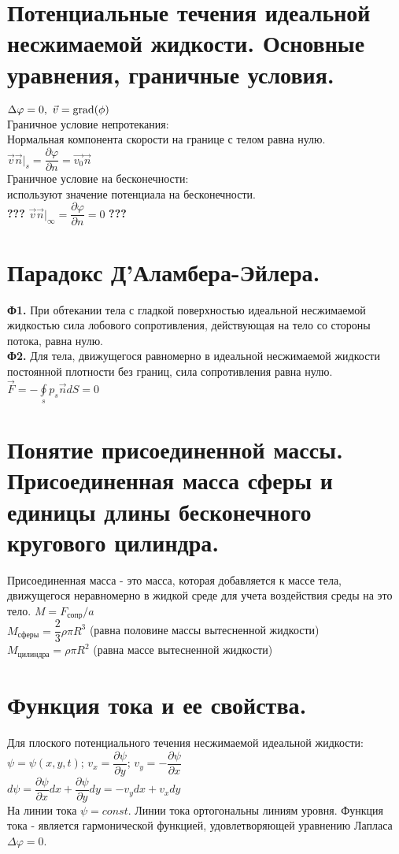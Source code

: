 \begin{multicols*}{2}
		\section{Потенциальные течения идеальной несжимаемой жидкости. Основные уравнения, граничные условия.}
		$\Delta \varphi=0,~\vec{v}=\operatorname{grad}(\phi)$ \\
		Граничное условие непротекания: \\
		Нормальная компонента скорости на границе с телом равна нулю.\\
		$\vec{v}\vec{n}|_s=\dfrac{\partial\varphi}{\partial n}=\vec{v_0}\vec{n}$ \\
		Граничное условие на бесконечности: \\
		используют значение потенциала на бесконечности.\\
		\textbf{???} $\vec{v}\vec{n}|_\infty =\dfrac{\partial\varphi}{\partial n}=0$ \textbf{???}
		
		\section{Парадокс Д’Аламбера-Эйлера.}
		\textbf{Ф1.} При обтекании тела с гладкой поверхностью идеальной
		несжимаемой жидкостью сила лобового сопротивления, действующая на тело
		со стороны потока, равна нулю. \\
		\textbf{Ф2.} Для тела, движущегося равномерно в идеальной несжимаемой жидкости постоянной плотности без границ, сила сопротивления равна
		нулю.\\
		$\vec{F}=-\oint\limits_sp_s\vec{n}dS=0$
		
		\section{Понятие присоединенной массы. Присоединенная масса сферы и единицы длины бесконечного кругового цилиндра.}
		Присоединенная масса - это масса, которая добавляется к массе тела, движущегося неравномерно в жидкой среде для учета воздействия среды на это тело.
		$M=F_\text{сопр}/a$ \\
		$M_\text{сферы}=\dfrac{2}{3}\rho\pi R^3$ (равна половине массы вытесненной жидкости)\\
		$M_\text{цилиндра}=\rho\pi R^2$ (равна массе вытесненной жидкости)
		
		\section{Функция тока и ее свойства.}
		Для плоского потенциального течения несжимаемой идеальной жидкости: \\
		$\psi = \psi (x, y, t)$; $v_{x}=\dfrac{\partial\psi}{\partial y}$; $v_{y}=-\dfrac{\partial\psi}{\partial x}$ \\
		$d\psi = \dfrac{\partial\psi}{\partial x}dx + \dfrac{\partial\psi}{\partial y}dy = -v_{y}dx + v_{x}dy$\\
		На линии тока $\psi = const$. Линии тока ортогональны линиям уровня. Функция тока - является гармонической функцией, удовлетворяющей уравнению Лапласа $\Delta \varphi = 0$. 
		

\end{multicols*}
